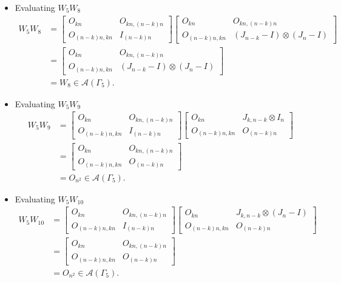 \begin{itemize}
\item Evaluating $W_{5}W_{8}$
\begin{align*}
    W_5W_8
    &= \begin{bmatrix}
        O_{kn} & O_{kn, (n-k)n} \\
        O_{(n-k)n,kn} & I_{(n - k)n}
    \end{bmatrix}
    \begin{bmatrix}
        O_{kn} & O_{kn, (n-k)n} \\
        O_{(n-k)n,kn} & (J_{n - k}-I) \otimes (J_n-I)
    \end{bmatrix}\\
    &= \begin{bmatrix}
        O_{kn} & O_{kn, (n-k)n} \\
        O_{(n-k)n,kn} & (J_{n - k}-I) \otimes (J_n-I)
    \end{bmatrix}\\
    &= W_8\in\mathcal{A}(\Gamma_5).
\end{align*}

\item Evaluating $W_{5}W_{9}$
\begin{align*}
    W_5W_9
    &= \begin{bmatrix}
        O_{kn} & O_{kn, (n-k)n} \\
        O_{(n-k)n,kn} & I_{(n - k)n}
    \end{bmatrix}
    \begin{bmatrix}
        O_{kn} & J_{k, n-k} \otimes I_n \\
        O_{(n-k)n,kn} & O_{(n - k)n}
    \end{bmatrix}\\
    &= \begin{bmatrix}
        O_{kn} & O_{kn, (n-k)n} \\
        O_{(n-k)n,kn} & O_{(n - k)n}
    \end{bmatrix}\\
    &= O_{n^2} \in\mathcal{A}(\Gamma_5).
\end{align*}

\item Evaluating $W_{5}W_{10}$
\begin{align*}
    W_5W_{10}
    &= \begin{bmatrix}
        O_{kn} & O_{kn, (n-k)n} \\
        O_{(n-k)n,kn} & I_{(n - k)n}
    \end{bmatrix}
    \begin{bmatrix}
        O_{kn} & J_{k, n-k} \otimes (J_n-I) \\
        O_{(n-k)n,kn} & O_{(n - k)n}
    \end{bmatrix}\\
    &= \begin{bmatrix}
        O_{kn} & O_{kn, (n-k)n} \\
        O_{(n-k)n,kn} & O_{(n - k)n}
    \end{bmatrix}\\
    &= O_{n^2} \in\mathcal{A}(\Gamma_5).
\end{align*}


\end{itemize}
